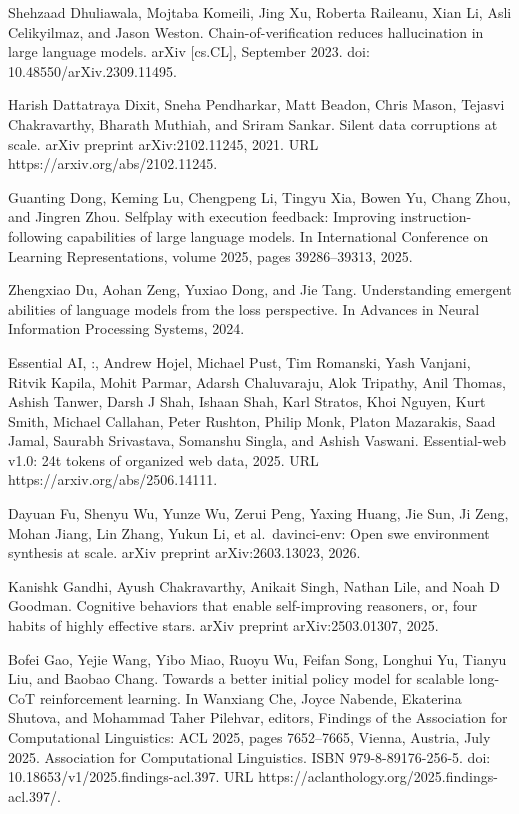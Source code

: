 \documentclass[
  10
]{article}
\begin{document}
Shehzaad Dhuliawala, Mojtaba Komeili, Jing Xu, Roberta Raileanu, Xian
Li, Asli Celikyilmaz, and Jason Weston. Chain-of-verification reduces
hallucination in large language models. arXiv {[}cs.CL{]}, September
2023. doi: 10.48550/arXiv.2309.11495.

Harish Dattatraya Dixit, Sneha Pendharkar, Matt Beadon, Chris Mason,
Tejasvi Chakravarthy, Bharath Muthiah, and Sriram Sankar. Silent data
corruptions at scale. arXiv preprint arXiv:2102.11245, 2021. URL
https://arxiv.org/abs/2102.11245.

Guanting Dong, Keming Lu, Chengpeng Li, Tingyu Xia, Bowen Yu, Chang
Zhou, and Jingren Zhou. Selfplay with execution feedback: Improving
instruction-following capabilities of large language models. In
International Conference on Learning Representations, volume 2025, pages
39286--39313, 2025.

Zhengxiao Du, Aohan Zeng, Yuxiao Dong, and Jie Tang. Understanding
emergent abilities of language models from the loss perspective. In
Advances in Neural Information Processing Systems, 2024.

Essential AI, :, Andrew Hojel, Michael Pust, Tim Romanski, Yash Vanjani,
Ritvik Kapila, Mohit Parmar, Adarsh Chaluvaraju, Alok Tripathy, Anil
Thomas, Ashish Tanwer, Darsh J Shah, Ishaan Shah, Karl Stratos, Khoi
Nguyen, Kurt Smith, Michael Callahan, Peter Rushton, Philip Monk, Platon
Mazarakis, Saad Jamal, Saurabh Srivastava, Somanshu Singla, and Ashish
Vaswani. Essential-web v1.0: 24t tokens of organized web data, 2025. URL
https://arxiv.org/abs/2506.14111.



Dayuan Fu, Shenyu Wu, Yunze Wu, Zerui Peng, Yaxing Huang, Jie Sun, Ji
Zeng, Mohan Jiang, Lin Zhang, Yukun Li, et al.~davinci-env: Open swe
environment synthesis at scale. arXiv preprint arXiv:2603.13023, 2026.

Kanishk Gandhi, Ayush Chakravarthy, Anikait Singh, Nathan Lile, and Noah
D Goodman. Cognitive behaviors that enable self-improving reasoners, or,
four habits of highly effective stars. arXiv preprint arXiv:2503.01307,
2025.

Bofei Gao, Yejie Wang, Yibo Miao, Ruoyu Wu, Feifan Song, Longhui Yu,
Tianyu Liu, and Baobao Chang. Towards a better initial policy model for
scalable long-CoT reinforcement learning. In Wanxiang Che, Joyce
Nabende, Ekaterina Shutova, and Mohammad Taher Pilehvar, editors,
Findings of the Association for Computational Linguistics: ACL 2025,
pages 7652--7665, Vienna, Austria, July 2025. Association for
Computational Linguistics. ISBN 979-8-89176-256-5. doi:
10.18653/v1/2025.findings-acl.397. URL
https://aclanthology.org/2025.findings-acl.397/.
\end{document}
